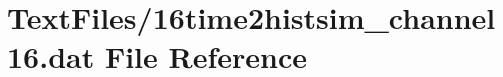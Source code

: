 \hypertarget{16time2histsim__channel16_8dat}{}\section{Text\+Files/16time2histsim\+\_\+channel16.dat File Reference}
\label{16time2histsim__channel16_8dat}
